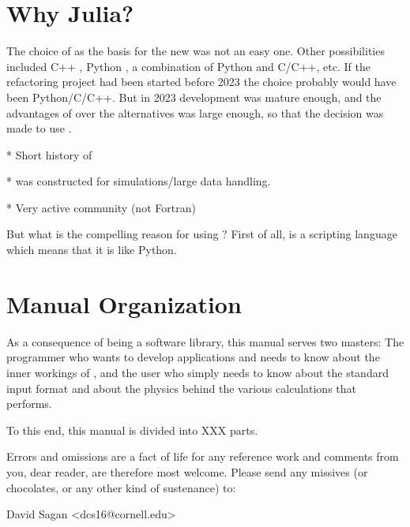 \section{Why Julia?}

The choice of \julia as the basis for the new \bmad was not an easy one. Other possibilities included
C++ \cite{}, Python \cite{}, a combination of Python and C/C++, etc. If the \bmad refactoring
project had been started before 2023 the choice probably would have been Python/C/C++. But in
2023 \julia development was mature enough, and the advantages of \julia over the alternatives was
large enough, so that the decision was made to use \julia.

* Short history of \julia

* \julia was constructed for simulations/large data handling.

* Very active community (not Fortran)

But what is the compelling reason for using \julia? First of all, \julia is a scripting language which
means that it is 
like Python. 

\section{Manual Organization}

As a consequence of \bmad being a software library, this manual serves two masters: The
programmer who wants to develop applications and needs to know about the inner workings of
\bmad, and the user who simply needs to know about the \bmad standard input format and
about the physics behind the various calculations that \bmad performs.

To this end, this manual is divided into XXX parts. 

Errors and omissions are a fact of life for any
reference work and comments from you, dear reader, are therefore most welcome. Please send
any missives (or chocolates, or any other kind of sustenance) to:
\begin{example}
  David Sagan <dcs16@cornell.edu>
\end{example}
